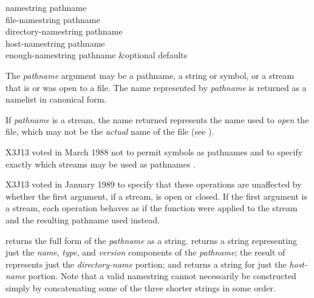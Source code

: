 \begin{defun}[Function]
namestring pathname \\
file-namestring pathname \\
directory-namestring pathname \\
host-namestring pathname \\
enough-namestring pathname &optional defaults

The {\it pathname} argument may be a pathname, a string or symbol,
or a stream that is or was open to a file.
The name represented by {\it pathname} is returned as a namelist
in canonical form.

If {\it pathname} is a stream, the name returned represents the
name used to {\it open} the file, which may not be the {\it actual}
name of the file (see ).

\begin{new}
X3J13 voted in March 1988
not to permit symbols as pathnames
 and
to specify exactly which streams may be used as pathnames
.
\end{new}

\begin{new}
X3J13 voted in January 1989
to specify that these operations are unaffected by
whether the first argument, if a stream, is open or closed. If the first
argument is a stream, each operation behaves as if the function 
were applied to the stream and the resulting pathname used instead.
\end{new}

 returns the full form of the {\it pathname} as a string.
 returns a string representing just the {\it name},
{\it type}, and {\it version} components of the {\it pathname};
the result of 
represents just the {\it directory-name} portion; and 
returns a string for just the {\it host-name} portion.
Note that a valid namestring cannot necessarily be constructed
simply by concatenating some of the three shorter strings in some order.


\end{defun}
